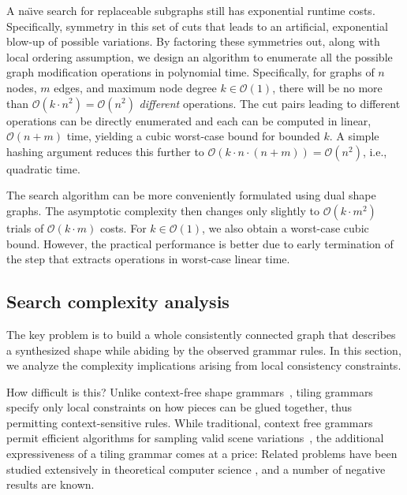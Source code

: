  A na\"{\i}ve search for replaceable subgraphs still has exponential runtime costs.
Specifically, symmetry in this set of cuts that leads to an artificial, exponential blow-up of possible variations. By factoring these symmetries out, along with local ordering assumption, we design an algorithm to enumerate all the possible graph modification operations in polynomial time. Specifically, for graphs of $n$ nodes, $m$ edges, and maximum node degree $k \in \mathcal{O}(1)$, there will be no more than $\mathcal{O}(k \cdot n^2)=\mathcal{O}(n^2)$ \emph{different} operations. The cut pairs leading to different operations can be directly enumerated and each can be computed in linear, $\mathcal{O}(n+m)$ time, yielding a cubic worst-case bound for bounded $k$. A simple hashing argument reduces this further to $\mathcal{O}(k \cdot n \cdot (n+m)) = \mathcal{O}(n^2)$, i.e., quadratic time.

 The search algorithm can be more conveniently formulated using dual shape graphs. The asymptotic complexity then changes only slightly to $\mathcal{O}(k \cdot m^2)$ trials of $\mathcal{O}(k \cdot m)$ costs. For $k \in \mathcal{O}(1)$, we also obtain a worst-case cubic bound. However, the practical performance is better due to early termination of the step that extracts operations in worst-case linear time.

\subsection{Search complexity analysis}

The key problem is to build a whole consistently connected graph that describes a synthesized shape while abiding by the observed grammar rules. In this section, we analyze the complexity implications arising from local consistency constraints.

How difficult is this? Unlike context-free shape grammars~\cite{StinyGibs71,Mueller2006}, tiling grammars specify only local constraints on how pieces can be glued together, thus permitting context-sensitive rules. While traditional, context free grammars permit efficient algorithms for sampling valid scene variations~\cite{Bokeloh2010}, the additional expressiveness of a tiling grammar comes at a price: Related problems have been studied extensively in theoretical computer science \cite{Reghizzi2003}, and a number of negative results are known.

